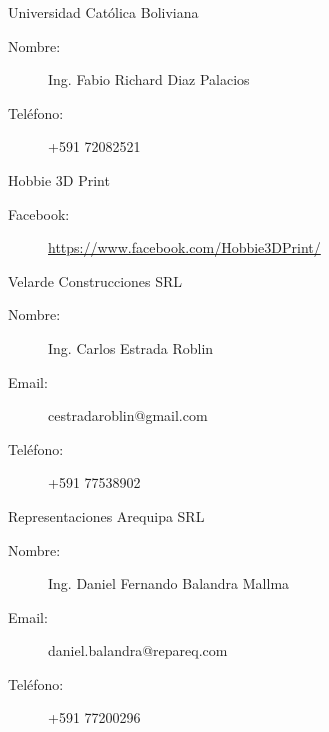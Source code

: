 \documentclass[a4paper,10pt]{article}
\begin{document}
\vspace{20pt}

\begin{thebibliography}{}

 Universidad Católica Boliviana
  \begin{description}
    \item[Nombre:] Ing. Fabio Richard Diaz Palacios
    \item[Teléfono:] +591 72082521
  \end{description}

 Hobbie 3D Print
  \begin{description}
    \item[Facebook:] \url{https://www.facebook.com/Hobbie3DPrint/}
  \end{description}

 Velarde Construcciones SRL
  \begin{description}
    \item[Nombre:] Ing. Carlos Estrada Roblin
    \item[Email:] cestradaroblin@gmail.com
    \item[Teléfono:] +591 77538902
  \end{description}

 Representaciones Arequipa SRL
  \begin{description}
    \item[Nombre:] Ing. Daniel Fernando Balandra Mallma
    \item[Email:] daniel.balandra@repareq.com
    \item[Teléfono:] +591 77200296
  \end{description}

\end{thebibliography}
\end{document}
